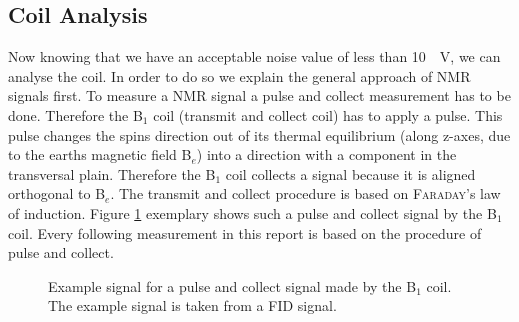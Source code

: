 \subsection{Coil Analysis}
\label{sec:CoilAnalyssis}
Now knowing that we have an acceptable noise value of less than \SI{10}{\mu \volt}, we can analyse the coil.
In order to do so we explain the general approach of NMR signals first.
To measure a NMR signal a pulse and collect measurement has to be done.
Therefore the B$_1$ coil (transmit and collect coil) has to apply a pulse.
This pulse changes the spins direction out of its thermal equilibrium (along z-axes, due to the earths magnetic field B$_e$) into a direction with a component in the transversal plain.
Therefore the B$_1$ coil collects a signal because it is aligned orthogonal to B$_e$.
The transmit and collect procedure is based on \textsc{Faraday}'s law of induction.
Figure \ref{fig: PulsandcollectValesignal} exemplary shows such a pulse and collect signal by the B$_1$ coil.
Every following measurement in this report is based on the procedure of pulse and collect.

\begin{figure}[H]
    \centering
    
    \caption[Example signal for a pulse and collect signal made by the B$_1$ coil.]{Example signal for a pulse and collect signal made by the B$_1$ coil.
    The example signal is taken from a FID signal.}
    \label{fig: PulsandcollectValesignal}
\end{figure}

